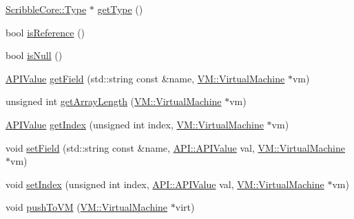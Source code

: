 \begin{DoxyCompactItemize}
\hyperlink{class_scribble_core_1_1_type}{Scribble\-Core\-::\-Type} $\ast$ \hyperlink{class_a_p_i_1_1_a_p_i_value_a50687d887d23aabffd1f9df7f3ba94a1}{get\-Type} ()
\item 
bool \hyperlink{class_a_p_i_1_1_a_p_i_value_a9f5b34b9c70f6279dea8f556698ca1f6}{is\-Reference} ()
\item 
bool \hyperlink{class_a_p_i_1_1_a_p_i_value_a8a97634f469ced8407f4ca6cdd0f9898}{is\-Null} ()
\item 
\hyperlink{class_a_p_i_1_1_a_p_i_value}{A\-P\-I\-Value} \hyperlink{class_a_p_i_1_1_a_p_i_value_ac52ce1c55cc0a808016b557d1fb74995}{get\-Field} (std\-::string const \&name, \hyperlink{class_v_m_1_1_virtual_machine}{V\-M\-::\-Virtual\-Machine} $\ast$vm)
\item 
unsigned int \hyperlink{class_a_p_i_1_1_a_p_i_value_a1506f360a478ac864b76fec0409bc117}{get\-Array\-Length} (\hyperlink{class_v_m_1_1_virtual_machine}{V\-M\-::\-Virtual\-Machine} $\ast$vm)
\item 
\hyperlink{class_a_p_i_1_1_a_p_i_value}{A\-P\-I\-Value} \hyperlink{class_a_p_i_1_1_a_p_i_value_a799ace497f1988f95af61d6796d67a19}{get\-Index} (unsigned int index, \hyperlink{class_v_m_1_1_virtual_machine}{V\-M\-::\-Virtual\-Machine} $\ast$vm)
\item 
void \hyperlink{class_a_p_i_1_1_a_p_i_value_aa516e6d20f842e2dfd60c1c59a697312}{set\-Field} (std\-::string const \&name, \hyperlink{class_a_p_i_1_1_a_p_i_value}{A\-P\-I\-::\-A\-P\-I\-Value} val, \hyperlink{class_v_m_1_1_virtual_machine}{V\-M\-::\-Virtual\-Machine} $\ast$vm)
\item 
void \hyperlink{class_a_p_i_1_1_a_p_i_value_aa8a379bf602fc10523bfc4a4867dbc55}{set\-Index} (unsigned int index, \hyperlink{class_a_p_i_1_1_a_p_i_value}{A\-P\-I\-::\-A\-P\-I\-Value} val, \hyperlink{class_v_m_1_1_virtual_machine}{V\-M\-::\-Virtual\-Machine} $\ast$vm)
\item 
void \hyperlink{class_a_p_i_1_1_a_p_i_value_a54a170b1214ed9daf309c889b7daf77e}{push\-To\-V\-M} (\hyperlink{class_v_m_1_1_virtual_machine}{V\-M\-::\-Virtual\-Machine} $\ast$virt)
\end{DoxyCompactItemize}
